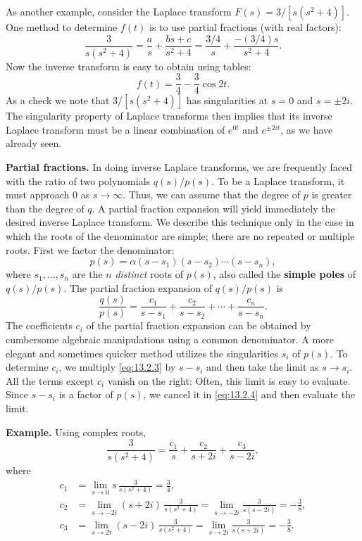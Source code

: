 As another example, consider the Laplace transform $F(s) = 3/[s(s^2+4)]$.  One method to determine $f(t)$ is to use partial fractions (with real factors):
\[
\frac{3}{s(s^2+4)} = \frac{a}{s} + \frac{bs+c}{s^2+4} = \frac{3/4}{s} + \frac{-(3/4)s}{s^2+4}.
\]
Now the inverse transform is easy to obtain using tables:
\[
f(t) = \frac{3}{4} - \frac{3}{4}\cos 2t.
\]
As a check we note that $3/[s(s^2+4)]$ has singularities at $s=0$ and $s=\pm 2i$.  The singularity property of Laplace transforms then implies that its inverse Laplace transform must be a linear combination of $e^{0t}$ and $e^{\pm 2it}$, as we have already seen.

\textbf{Partial fractions.}
In doing inverse Laplace transforms, we are frequently faced with the ratio of two polynomials $q(s)/p(s)$.  To be a Laplace transform, it must approach $0$ as $s\to\infty$.  Thus, we can assume that the degree of $p$ is greater than the degree of $q$.  A partial fraction expansion will yield immediately the desired inverse Laplace transform.  We describe this technique only in the case in which the roots of the denominator are simple; there are no repeated or multiple roots.  First we factor the denominator:
\[
p(s) = \alpha(s-s_1)(s-s_2)\cdots(s-s_n),
\]
where $s_1,\dots,s_n$ are the $n$ \emph{distinct} roots of $p(s)$, also called the \textbf{simple poles} of $q(s)/p(s)$.  The partial fraction expansion of $q(s)/p(s)$ is
\begin{equation}
\frac{q(s)}{p(s)} = \frac{c_1}{s-s_1} + \frac{c_2}{s-s_2} + \cdots + \frac{c_n}{s-s_n}.
\label{eq:13.2.3}
\end{equation}
The coefficients $c_i$ of the partial fraction expansion can be obtained by cumbersome algebraic manipulations using a common denominator.  A more elegant and sometimes quicker method utilizes the singularities $s_i$ of $p(s)$.  To determine $c_i$, we multiply \eqref{eq:13.2.3} by $s - s_i$ and then take the limit as $s \to s_i$.  All the terms except $c_i$ vanish on the right:
Often, this limit is easy to evaluate.  Since $s - s_i$ is a factor of $p(s)$, we cancel it in \eqref{eq:13.2.4} and then evaluate the limit.

\textbf{Example.} Using complex roots,
\[
\frac{3}{s(s^2+4)} = \frac{c_1}{s} + \frac{c_2}{s+2i} + \frac{c_3}{s-2i},
\]
where
\begin{align*}
c_1 &= \lim_{s\to 0} s\,\frac{3}{s(s^2+4)} = \frac{3}{4},\\
c_2 &= \lim_{s\to -2i} (s+2i)\,\frac{3}{s(s^2+4)}
     = \lim_{s\to -2i} \frac{3}{s(s-2i)} = -\frac{3}{8},\\
c_3 &= \lim_{s\to 2i} (s-2i)\,\frac{3}{s(s^2+4)}
     = \lim_{s\to 2i} \frac{3}{s(s+2i)} = -\frac{3}{8}.
\end{align*}

